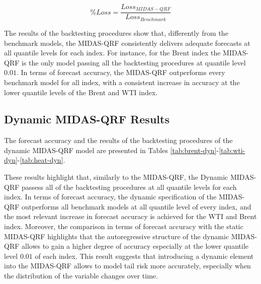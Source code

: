 $$
\textit{\% Loss}=\frac{Loss_{MIDAS-QRF}}{Loss_{Benchmark}}
$$


\vspace{0.15in}

\noindent The results of the backtesting procedures show that, differently from the benchmark models, the MIDAS-QRF consistently delivers adequate forecasts at all quantile levels for each index. For instance, for the Brent index the MIDAS-QRF is the only model passing all the backtesting procedures at quantile level $0.01$. In terms of forecast accuracy, the MIDAS-QRF outperforms every benchmark model for all index, with a consistent increase in accuracy at the lower quantile levels of the Brent and WTI index.








\newpage

\subsection{Dynamic MIDAS-QRF Results}
The forecast accuracy and the results of the  backtesting procedures of the dynamic MIDAS-QRF model are presented in Tables \ref{tab:brent-dyn}-\ref{tab:wti-dyn}-\ref{tab:heat-dyn}.

\vspace{0.15in}

\noindent These results highlight that, similarly to the MIDAS-QRF, the Dynamic MIDAS-QRF passess all of the backtesting procedures at all quantile levels for each index. In terms of forecast accuracy, the dynamic specification of the MIDAS-QRF outperforms all benchmark models at all quantile level of every index, and the most relevant increase in forecast accuracy is achieved for the WTI and Brent index.
Moreover, the comparison in terms of forecast accuracy with the static MIDAS-QRF highlights that the autoregressive structure of the dynamic MIDAS-QRF  allows to gain a higher degree of accuracy especially at the lower quantile level $0.01$ of each index. This result suggests that introducing a dynamic element into the MIDAS-QRF allows to model tail risk more accurately, especially when the distribution of the variable changes over time.






